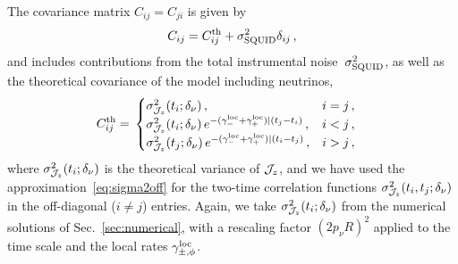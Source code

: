 \documentclass[aps,prd,10pt,twocolumn,superscriptaddress,floatfix,nofootinbib,amsmath,amssymb,altaffilletter,preprintnumbers]{revtex4-1}
\begin{document}
The covariance matrix $C_{ij}=C_{ji}$ is given by
\begin{equation}
C_{ij} = C_{ij}^{\rm th} + \sigma^2_{\rm SQUID} \delta_{ij}\, ,   
\end{equation}
and includes contributions from the total instrumental noise~$\sigma_{\rm SQUID}^2$, as well as 
the theoretical covariance of the model including neutrinos, 
\begin{equation}
\begin{aligned}
C_{ij}^{\rm th} =\; & \begin{cases}
                    \sigma^2_{{\cal J}_z} (t_i;\delta_\nu)\, , & i=j\, , \\
                    \sigma^2_{{\cal J}_z}(t_i; \delta_\nu)\,  e^{-(\gamma_- ^{\rm loc}+\gamma_+^{\rm loc})|(t_j-t_i)}\, , & i < j\, ,\\
                     \sigma^2_{{\cal J}_z}(t_j; \delta_\nu) \, e^{-(\gamma_- ^{\rm loc}+\gamma_+^{\rm loc})|(t_i-t_j)}\, , & i > j\, ,\\
                    \end{cases}   
\end{aligned}
\end{equation}
where $\sigma^2_{{\cal J}_z}(t_i;\delta_\nu)$ is the theoretical variance of ${\cal J}_z$, and we have used the approximation~\eqref{eq:sigma2off} for the two-time correlation functions $\sigma^2_{{\cal J}_z}(t_i, t_j; \delta_\nu)$ in the off-diagonal ($i\neq j$) entries.  Again, we take  $\sigma^2_{{\cal J}_z}(t_i;\delta_\nu)$ from the numerical solutions of Sec.~\ref{sec:numerical}, with a rescaling factor $(2 p_\nu R)^{2}$ applied to the time scale and the local rates $\gamma_{\pm,\phi}^{\rm loc}$.
\end{document}

